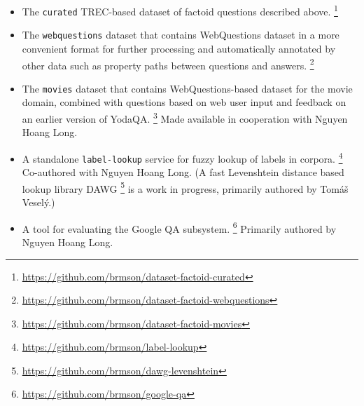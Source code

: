 \begin{itemize}
\item The \texttt{curated} TREC-based dataset of factoid questions described above.%
\footnote{\url{https://github.com/brmson/dataset-factoid-curated}}

\item The \texttt{webquestions} dataset that contains WebQuestions dataset in a more convenient format for further processing and automatically annotated by other data such as property paths between questions and answers.%
\footnote{\url{https://github.com/brmson/dataset-factoid-webquestions}}

\item The \texttt{movies} dataset that contains WebQuestions-based dataset for the movie domain, combined with questions based on web user input and feedback on an earlier version of YodaQA.%
\footnote{\url{https://github.com/brmson/dataset-factoid-movies}}
Made available in cooperation with Nguyen Hoang Long.

\item A standalone \texttt{label-lookup} service for fuzzy lookup of labels in corpora.%
\footnote{\url{https://github.com/brmson/label-lookup}}
	Co-authored with Nguyen Hoang Long.
	(A fast Levenshtein distance based lookup library DAWG%
\footnote{\url{https://github.com/brmson/dawg-levenshtein}}
	is a work in progress,
	primarily authored by Tomáš Veselý.)

\item A tool for evaluating the Google QA subsystem.%
\footnote{\url{https://github.com/brmson/google-qa}}
	Primarily authored by Nguyen Hoang Long.
\end{itemize}
